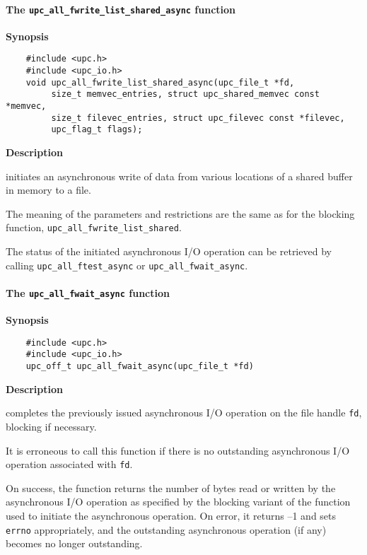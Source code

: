 \paragraph{The {\tt upc\_all\_fwrite\_list\_shared\_async} function}

{\bf Synopsis}

\npf\vspace{-2.5em}
\begin{verbatim}
    #include <upc.h>
    #include <upc_io.h>
    void upc_all_fwrite_list_shared_async(upc_file_t *fd,
         size_t memvec_entries, struct upc_shared_memvec const *memvec,
         size_t filevec_entries, struct upc_filevec const *filevec,
         upc_flag_t flags);
\end{verbatim}

{\bf Description}

 initiates an asynchronous write of
data from various locations of a shared buffer in memory to a file.

\np The meaning of the parameters and restrictions are the same as for the
blocking function, {\tt upc\_all\_fwrite\_list\_shared}.

\np The status of the initiated asynchronous I/O operation can be retrieved by calling
{\tt upc\_all\_ftest\_async} or {\tt upc\_all\_fwait\_async}.

\paragraph{The {\tt upc\_all\_fwait\_async} function}

{\bf Synopsis}

\npf\vspace{-2.5em}
\begin{verbatim}
    #include <upc.h>
    #include <upc_io.h>
    upc_off_t upc_all_fwait_async(upc_file_t *fd)
\end{verbatim}

{\bf Description}

 completes the previously issued asynchronous I/O
operation on the file handle {\tt fd}, blocking if necessary.

\np It is erroneous to call this function if there is no outstanding
asynchronous I/O operation associated with {\tt fd}.

\np On success, the function returns the number of bytes read or written by the
asynchronous I/O operation as specified by the blocking variant of the
function used to initiate the asynchronous operation. On error, it returns
--1 and sets {\tt errno} appropriately, and the outstanding asynchronous operation
(if any) becomes no longer outstanding.

